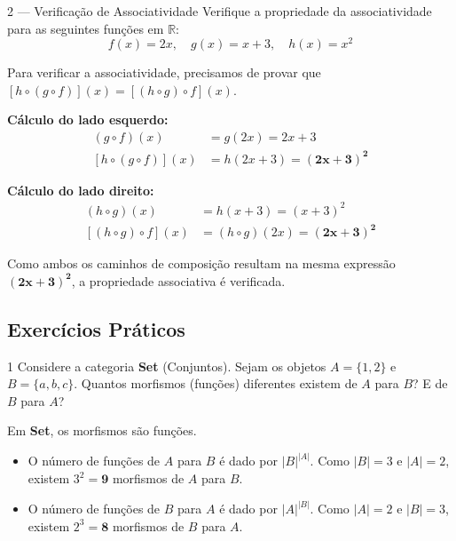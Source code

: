 \begin{exbox}{2 --- Verificação de Associatividade}
  Verifique a propriedade da associatividade para as seguintes funções em $\mathbb{R}$:
  \[ f(x) = 2x, \quad g(x) = x+3, \quad h(x) = x^2 \]
\end{exbox}
\begin{solbox}
  Para verificar a associatividade, precisamos de provar que $[h \circ (g \circ f)](x) = [(h \circ g) \circ f](x)$.
  
  \textbf{Cálculo do lado esquerdo:}
  \begin{align*}
      (g \circ f)(x) &= g(2x) = 2x + 3 \\
      [h \circ (g \circ f)](x) &= h(2x + 3) = \mathbf{(2x + 3)^2}
  \end{align*}
  
  \textbf{Cálculo do lado direito:}
  \begin{align*}
      (h \circ g)(x) &= h(x + 3) = (x + 3)^2 \\
      [(h \circ g) \circ f](x) &= (h \circ g)(2x) = \mathbf{(2x + 3)^2}
  \end{align*}
  
  Como ambos os caminhos de composição resultam na mesma expressão $\mathbf{(2x + 3)^2}$, a propriedade associativa é verificada. \checkmark
\end{solbox}


\subsection{Exercícios Práticos}

\begin{exercisebox}{1}
  Considere a categoria \textbf{Set} (Conjuntos). Sejam os objetos $A = \{1, 2\}$ e $B = \{a, b, c\}$. Quantos morfismos (funções) diferentes existem de $A$ para $B$? E de $B$ para $A$?
\end{exercisebox}
\begin{solbox}
  Em \textbf{Set}, os morfismos são funções.
  \begin{itemize}
      \item O número de funções de $A$ para $B$ é dado por $|B|^{|A|}$. Como $|B|=3$ e $|A|=2$, existem $3^2 = \mathbf{9}$ morfismos de $A$ para $B$.
      \item O número de funções de $B$ para $A$ é dado por $|A|^{|B|}$. Como $|A|=2$ e $|B|=3$, existem $2^3 = \mathbf{8}$ morfismos de $B$ para $A$.
  \end{itemize}
\end{solbox}


